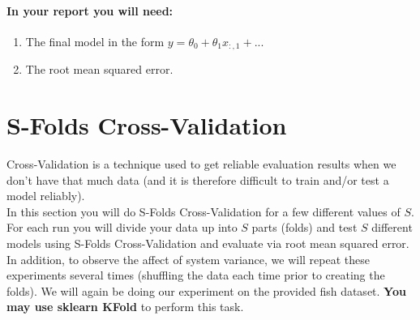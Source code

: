 \documentclass[12pt]{article}
\begin{document}
\paragraph{In your report you will need:}
\begin{enumerate}
\item The final model in the form $y=\theta_0+\theta_1x_{:,1} + ...$
\item The root mean squared error.
\end{enumerate}

\newpage
\section{S-Folds Cross-Validation}\label{linreg}
Cross-Validation is a technique used to get reliable evaluation results when we don't have that much data (and it is therefore difficult to train and/or test a model reliably).\\

\noindent
In this section you will do S-Folds Cross-Validation for a few different values of $S$.  For each run you will divide your data up into $S$ parts (folds) and test $S$ different models using S-Folds Cross-Validation and evaluate via root mean squared error.  In addition, to observe the affect of system variance, we will repeat these experiments several times (shuffling the data each time prior to creating the folds).  We will again be doing our experiment on the provided fish dataset.  \textbf{You may use sklearn KFold} to perform this task.\\
\end{document}
